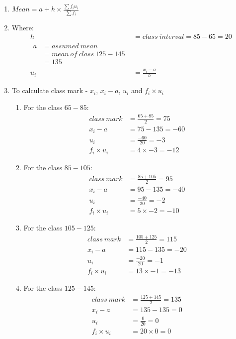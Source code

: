 \begin{enumerate}

\item $Mean = a + h \times \frac{\sum f_i u_i}{\sum f_i}$

\item Where:
\begin{align*}
h &= class\ interval = 85 - 65 = 20 \\
\begin{split}
a &= assumed\ mean\\
&= mean\ of\ class\ 125-145\\
&=135
\end{split}\\
u_i &= \frac{x_i-a}{h}
\end{align*}

\item To calculate class mark - $x_i$, $x_i - a$, $u_i$ and $f_i \times u_i$
\begin{enumerate}

\item For the class $65-85$:
\begin{align*}
class\ mark &= \frac{65+85}{2} = 75\\
x_i - a &= 75-135 = -60\\
u_i &= \frac{-60}{20} = -3 \\
f_i \times u_i &= 4 \times -3 = -12 
\end{align*}

\item For the class $85-105$:
\begin{align*}
class\ mark &= \frac{85+105}{2} = 95\\
x_i - a &= 95-135 = -40\\
u_i &= \frac{-40}{20} = -2\\ 
f_i \times u_i &= 5 \times -2 = -10 
\end{align*}

\item For the class $105-125$:
\begin{align*}
class\ mark &= \frac{105+125}{2} = 115\\
x_i - a &= 115-135 = -20\\
u_i &= \frac{-20}{20} = -1\\ 
f_i \times u_i &= 13 \times -1 = -13 
\end{align*}

\item For the class $125-145$:
\begin{align*}
class\ mark &= \frac{125+145}{2} = 135\\
x_i - a &= 135-135 = 0\\
u_i &= \frac{0}{20} = 0\\ 
f_i \times u_i &= 20 \times 0 = 0 
\end{align*}


\end{enumerate}
\end{enumerate}
